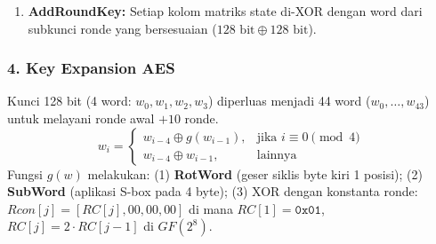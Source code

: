 \documentclass[11pt,a4paper]{article}
\begin{document}
\begin{enumerate}[leftmargin=*]
\begin{thmbox}{Representasi Matriks Perkalian MixColumns (Pola Soal UTS 2020-2021 No 5)}
\[\begin{bmatrix}
    02 & 03 & 01 & 01 \\
    01 & 02 & 03 & 01 \\
    01 & 01 & 02 & 03 \\
    03 & 01 & 01 & 02
    \end{bmatrix}
    \begin{bmatrix}
    s_{0,c} \\ s_{1,c} \\ s_{2,c} \\ s_{3,c}
    \end{bmatrix}
    \]
    \textbf{Catatan Krusial:} Pada ronde terakhir (ronde 10 pada AES-128), transformasi \textbf{MixColumns ditiadakan}!
    \end{thmbox}
    \item \textbf{AddRoundKey:} Setiap kolom matriks state di-XOR dengan word dari subkunci ronde yang bersesuaian ($128 \text{ bit} \oplus 128 \text{ bit}$).
\end{enumerate}

\subsubsection{4. Key Expansion AES}
Kunci 128 bit (4 word: $w_0, w_1, w_2, w_3$) diperluas menjadi 44 word ($w_0, \dots, w_{43}$) untuk melayani ronde awal $+ 10$ ronde.
\[
w_i = \begin{cases}
w_{i-4} \oplus g(w_{i-1}), & \text{jika } i \equiv 0 \pmod 4 \\
w_{i-4} \oplus w_{i-1}, & \text{lainnya}
\end{cases}
\]
Fungsi $g(w)$ melakukan: (1) \textbf{RotWord} (geser siklis byte kiri 1 posisi); (2) \textbf{SubWord} (aplikasi S-box pada 4 byte); (3) XOR dengan konstanta ronde: $Rcon[j] = [RC[j], 00, 00, 00]$ di mana $RC[1] = \mathtt{0x01}$, $RC[j] = 2 \cdot RC[j-1]$ di $GF(2^8)$.
\end{document}
